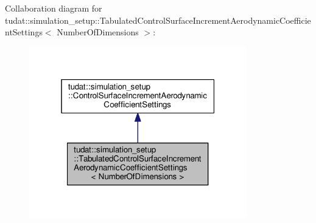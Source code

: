 Collaboration diagram for tudat\+:\+:simulation\+\_\+setup\+:\+:Tabulated\+Control\+Surface\+Increment\+Aerodynamic\+Coefficient\+Settings$<$ Number\+Of\+Dimensions $>$\+:
\nopagebreak
\begin{figure}[H]
\begin{center}
\leavevmode
\includegraphics[width=268pt]{classtudat_1_1simulation__setup_1_1TabulatedControlSurfaceIncrementAerodynamicCoefficientSettings__coll__graph}
\end{center}
\end{figure}
